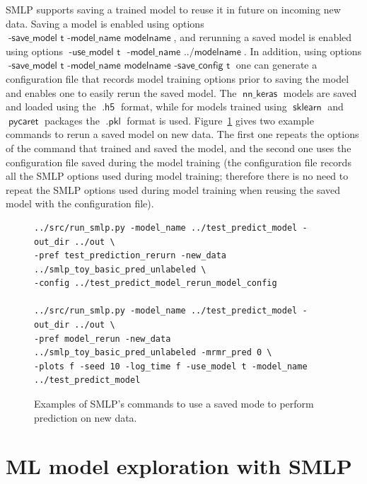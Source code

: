 \documentclass[a4paper,parskip=half]{article} %
\newcommand*\option[1]{\operatorname{\mathsf{#1}}} %
\newcommand*\suffix[1]{\operatorname{\mathsf{#1}}} %
\newcommand*\package[1]{\operatorname{\mathsf{#1}}} %
\begin{document}
SMLP supports saving a trained model to reuse it in future on incoming new data. 
Saving a model is enabled using options $\option{-save\_model\,\, t\,\,-model\_name \,\,modelname}$,
and rerunning a saved model is enabled using options $\option{-use\_model\,\, t\ \,\,-model\_name \,\,../modelname}$.
In addition, using options $\option{-save\_model\,\, t\,\,-model\_name \,\,modelname\,\, -save\_config\,\, t}$ 
one can generate a configuration file that records model training options prior to saving the model and  enables one 
to easily rerun the saved model. The $\option{nn\_keras}$ models are saved and loaded using the $\suffix{.h5}$
format, while for models trained using $\package{sklearn}$ and $\package{pycaret}$ packages the  $\option{.pkl}$ format 
 is used. Figure~\ref{fig:pred:rerun:saved} gives two example commands to rerun a saved model on new data.
The first one repeats the options of the command that trained and saved the model, and the second
one uses the configuration file saved during the model training (the configuration file records all the SMLP options
used during model training; therefore there is no need to repeat the SMLP options used during model training
when reusing the saved model with the configuration file). 

\begin{figure}%
\begin{verbatim}
../src/run_smlp.py -model_name ../test_predict_model -out_dir ../out \ 
-pref test_prediction_rerurn -new_data ../smlp_toy_basic_pred_unlabeled \
-config ../test_predict_model_rerun_model_config 

../src/run_smlp.py -model_name ../test_predict_model -out_dir ../out \ 
-pref model_rerun -new_data ../smlp_toy_basic_pred_unlabeled -mrmr_pred 0 \
-plots f -seed 10 -log_time f -use_model t -model_name ../test_predict_model  

\end{verbatim}
\caption{Examples of SMLP's commands to use a saved mode to perform prediction on new data.}
\label{fig:pred:rerun:saved}
\end{figure}

\section{ML model exploration with SMLP}\label{sec:exploration}
\end{document}

